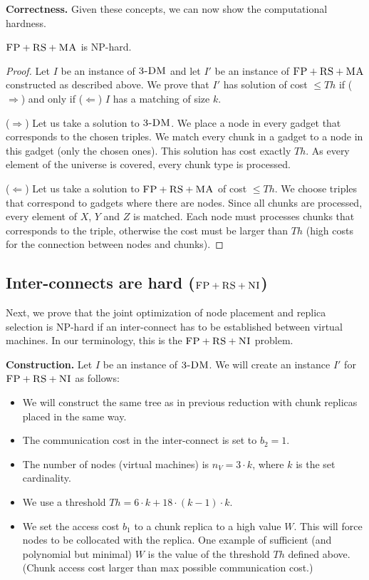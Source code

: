 \documentclass[9pt]{sigcomm-alternate}
\newcommand{\maciek}[1]{\textcolor{brown}{maciek: #1}}
\newcommand{\CC}{\textsc{NI}}
\newcommand{\FP}{\textsc{FP}}
\newcommand{\RS}{\textsc{RS}}
\newcommand{\MA}{\textsc{MA}}
\newcommand{\CostTrans}{\ensuremath{b_1}}
\newcommand{\CostCom}{\ensuremath{b_2}}
\newcommand{\Vms}{\ensuremath{n_V}}
\newcommand{\TDM}{\textsc{3-DM}}
\newcommand{\Thr}{\ensuremath{Th}}
\begin{document}
\textbf{Correctness.}
Given these concepts, we can now show the computational hardness.
\begin{theorem}
$\FP+\RS+\MA$ is NP-hard.
\end{theorem}
\begin{proof}
Let $I$ be an instance of $\TDM$ and let $I'$ be an instance of
$\FP+\RS+\MA$ constructed as described above.
We prove that $I'$ has solution of cost $\leq \Thr$ if ($\Rightarrow$) and only if
($\Leftarrow$)
$I$ has a matching of size $k$.

($\Rightarrow$) Let us take a solution to $\TDM$. We place a node in every
gadget that corresponds to the chosen triples. We match every chunk in a
gadget to a node in this gadget (only the chosen ones). This solution has
cost exactly $\Thr$. As every element of the universe is covered, every
chunk type is processed.

($\Leftarrow$) Let us take a solution to $\FP+\RS+\MA$ of cost $\leq \Thr$. We
choose triples that correspond to gadgets where there are nodes. Since
all chunks are processed, every element of $X$, $Y$ and $Z$ is matched. Each
node must processes chunks that corresponds to the triple, otherwise the
cost must be larger than $\Thr$ (high costs for the connection between
nodes and chunks).
\end{proof}


\subsection{Inter-connects are hard ($\FP+\RS+\CC$)}\label{ssec:fprscc}

Next, we prove that the joint optimization of node placement and replica selection
is NP-hard if an inter-connect has to be established between virtual machines.
In our terminology, this is the $\FP+\RS+\CC$ problem.

\textbf{Construction.}
Let $I$ be an instance of $\TDM$. We will create an instance $I'$
for $\FP+\RS+\CC$ as follows:
\begin{itemize}
\item We will construct the same tree as in previous reduction with
chunk replicas placed in the same way.
\item The communication cost in the inter-connect is set to $\CostCom = 1$.
\item The number of nodes (virtual machines) is $\Vms = 3 \cdot k$, where $k$ is the set cardinality.
\item We use a threshold $\Thr =  6 \cdot k + 18 \cdot
(k - 1) \cdot k$.
\item We set the access cost $\CostTrans$ to a chunk replica to a high value $W$. This will force
nodes to be collocated with the replica. One example of sufficient
(and polynomial but minimal) $W$
is the value of the threshold $\Thr$ defined above. (Chunk access cost larger than max possible
communication cost.)
\end{itemize}
\end{document}
